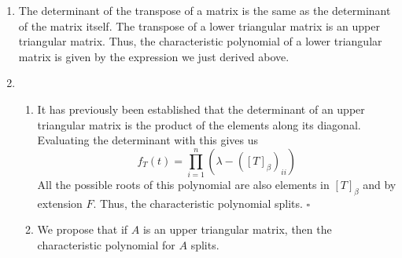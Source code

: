 \documentclass[12pt]{article}
\begin{document}
\begin{enumerate}
\begin{enumerate}
                  \item The determinant of the transpose of a matrix is the same as the determinant of the matrix itself.
                        The transpose of a lower triangular matrix is an upper triangular matrix.
                        Thus, the characteristic polynomial of a lower triangular matrix is given by the expression
                        we just derived above.
                  \item \begin{enumerate}
                              \item It has previously been established that the determinant of an upper triangular matrix is the product of the elements along its diagonal.
                                    Evaluating the determinant with this gives us
                                    \[f_T(t)=\prod_{i=1}^{n} (\lambda-([T]_\beta)_{ii})\]
                                    All the possible roots of this polynomial are also elements in $[T]_\beta$ and by extension $F$.
                                    Thus, the characteristic polynomial splits. $\square$
                              \item We propose that if $A$ is an upper triangular matrix, then the characteristic polynomial for $A$ splits.


\end{enumerate}
\end{enumerate}
\end{enumerate}
\end{document}
